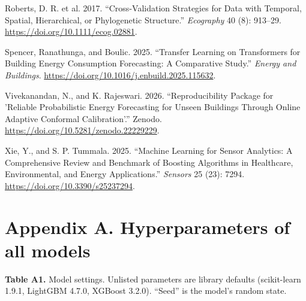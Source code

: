 \documentclass[
  10pt,
]{article}
\newlength{\cslhangindent}
\newlength{\cslentryspacingunit} %
\newenvironment{CSLReferences}[2] %
 {%
  \setlength{\parindent}{0pt}
  \ifodd #1
  \let\oldpar\par
  \def\par{\hangindent=\cslhangindent\oldpar}
  \fi
  \setlength{\parskip}{#2\cslentryspacingunit}
 }%
 {}
\begin{document}
\begin{CSLReferences}{1}{0}
\leavevmode{}%
Roberts, D. R. et al. 2017. {``Cross-Validation Strategies for Data with
Temporal, Spatial, Hierarchical, or Phylogenetic Structure.''}
\emph{Ecography} 40 (8): 913--29.
\url{https://doi.org/10.1111/ecog.02881}.

\leavevmode{}%
Spencer, Ranathunga, and Boulic. 2025. {``Transfer Learning on
Transformers for Building Energy Consumption Forecasting: A Comparative
Study.''} \emph{Energy and Buildings}.
\url{https://doi.org/10.1016/j.enbuild.2025.115632}.

\leavevmode{}%
Vivekanandan, N., and K. Rajeswari. 2026. {``Reproducibility Package for
'Reliable Probabilistic Energy Forecasting for Unseen Buildings Through
Online Adaptive Conformal Calibration'.''} Zenodo.
\url{https://doi.org/10.5281/zenodo.22229229}.

\leavevmode{}%
Xie, Y., and S. P. Tummala. 2025. {``Machine Learning for Sensor
Analytics: A Comprehensive Review and Benchmark of Boosting Algorithms
in Healthcare, Environmental, and Energy Applications.''} \emph{Sensors}
25 (23): 7294. \url{https://doi.org/10.3390/s25237294}.

\end{CSLReferences}

\hypertarget{appendix-a.-hyperparameters-of-all-models}{%
\section{Appendix A. Hyperparameters of all
models}\label{appendix-a.-hyperparameters-of-all-models}}

\textbf{Table A1.} Model settings. Unlisted parameters are library
defaults (scikit-learn 1.9.1, LightGBM 4.7.0, XGBoost 3.2.0). ``Seed''
is the model's random state.
\end{document}
